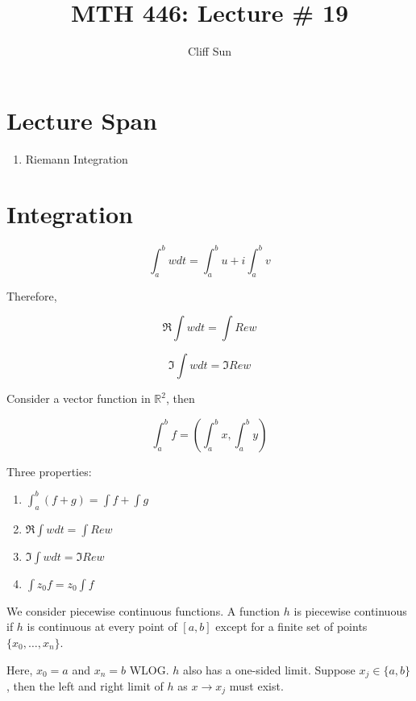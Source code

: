 \documentclass{article}
\title{MTH 446: Lecture \# 19}
\author{Cliff Sun}
\newtheorem{one minute paper}[theorem]{One Minute Paper}
\begin{document}
\maketitle

\section*{Lecture Span}
\begin{enumerate}
    \item Riemann Integration
\end{enumerate}

\section*{Integration}

\begin{equation}
    \int_a^b w dt = \int_a^b u + i\int_a^b v
\end{equation}

Therefore, 

\begin{equation}
    \Re \int w dt = \int Re w
\end{equation}

\begin{equation}
    \Im \int w dt = \Im Re w
\end{equation}

Consider a vector function in $\mathbb{R}^2$, then 

\begin{equation}
    \int_a^b f = (\int_a^b x, \int_a^b y)
\end{equation}

Three properties:
\begin{enumerate}
    \item $\int_a^b (f + g) = \int f + \int g$
    \item $\Re \int w dt = \int Re w$
    \item $\Im \int w dt = \Im Re w$
    \item $\int z_0 f = z_0 \int f$
\end{enumerate}

We consider piecewise continuous functions. 
A function $h$ is piecewise continuous if $h$ is continuous at every point of $[a,b]$ except for a finite set of points $\{x_0,\dots, x_n\}$. 

Here, $x_0 = a$ and $x_n = b$ WLOG. $h$ also has a one-sided limit. Suppose $x_j \in \{a,b\}$, then the left and right limit of $h$ as $x \to x_j$ must exist.
\end{document}
